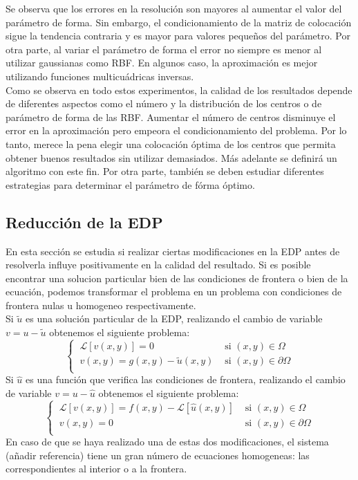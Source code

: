 \documentclass[11pt,a4paper]{article}
\begin{document}
Se observa que los errores en la resolución son mayores al aumentar el valor del parámetro de forma. Sin embargo, el condicionamiento de la matriz de colocación sigue la tendencia contraria y es mayor para valores pequeños del parámetro. Por otra parte, al variar el parámetro de forma el error no siempre es menor al utilizar gaussianas como RBF. En algunos caso, la aproximación es mejor utilizando funciones multicuádricas inversas. \\

Como se observa en todo estos experimentos, la calidad de los resultados depende de diferentes aspectos como el número y la distribución de los centros o de parámetro de forma de las RBF. Aumentar el número de centros disminuye el error en la aproximación pero empeora el condicionamiento del problema. Por lo tanto, merece la pena  elegir una colocación óptima de los centros que permita obtener buenos resultados sin utilizar demasiados. Más adelante se definirá un algoritmo con este fin. Por otra parte, también se deben estudiar diferentes estrategias para determinar el parámetro de fórma óptimo. 

\subsection{Reducción de la EDP}
En esta sección se estudia si realizar ciertas modificaciones en la EDP antes de resolverla influye positivamente en la calidad del resultado. Si es posible encontrar una solucion particular bien de las condiciones de frontera o bien de la ecuación, podemos transformar el problema en un problema con condiciones de frontera nulas u homogeneo respectivamente.\\
Si $\tilde{u}$ es una solución particular de la EDP, realizando el cambio de variable $v=u-\tilde{u}$ obtenemos el siguiente problema: 
$$\left \lbrace \begin{array}{cc}
\ \mathcal{L}[v(x,y)]=0 & \text{ si } (x,y) \in \Omega \\
\ v(x,y)=g(x,y)-\tilde{u}(x,y) &  \text{ si } (x,y) \in \partial\Omega \\
\end{array} \right.$$
Si $\hat{u}$ es una función que verifica las condiciones de frontera, realizando el cambio de variable $v=u-\hat{u}$ obtenemos el siguiente problema: 
$$\left \lbrace \begin{array}{cc}
\ \mathcal{L}[v(x,y)]=f(x,y)-\mathcal{L}[\hat{u}(x,y) ]& \text{ si } (x,y) \in \Omega \\
\ v(x,y)=0 & \text{ si } (x,y) \in \partial\Omega \\
\end{array} \right.$$
En caso de que se haya realizado una de estas dos modificaciones, el sistema (añadir referencia) tiene un gran número de ecuaciones homogeneas: las correspondientes al interior o a la frontera. \\
\end{document}

